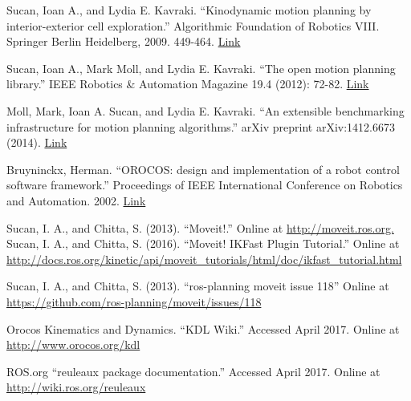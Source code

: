 \documentclass[12pt]{report}
\begin{document}
\begin{thebibliography}{99}
 Sucan, Ioan A., and Lydia E. Kavraki. ``Kinodynamic motion planning by interior-exterior cell exploration.'' Algorithmic Foundation of Robotics VIII. Springer Berlin Heidelberg, 2009. 449-464. \href{http://www.wafr.org/wafr2008/papers/wafr08-sucan.pdf}{Link}

 Sucan, Ioan A., Mark Moll, and Lydia E. Kavraki. ``The open motion planning library.'' IEEE Robotics \& Automation Magazine 19.4 (2012): 72-82. \href{http://ieeexplore.ieee.org/abstract/document/6377468/}{Link}

 Moll, Mark, Ioan A. Sucan, and Lydia E. Kavraki. ``An extensible benchmarking infrastructure for motion planning algorithms.'' arXiv preprint arXiv:1412.6673 (2014). \href{https://arxiv.org/pdf/1412.6673.pdf}{Link}

 Bruyninckx, Herman. ``OROCOS: design and implementation of a robot control software framework.'' Proceedings of IEEE International Conference on Robotics and Automation. 2002. \href{http://citeseerx.ist.psu.edu/viewdoc/download?doi=10.1.1.415.9503&rep=rep1&type=pdf}{Link}

 Sucan, I. A., and Chitta, S. (2013). ``Moveit!.'' Online at \url{http://moveit.ros.org.}
 Sucan, I. A., and Chitta, S. (2016). ``Moveit! IKFast Plugin Tutorial.'' Online at \url{http://docs.ros.org/kinetic/api/moveit_tutorials/html/doc/ikfast_tutorial.html}

 Sucan, I. A., and Chitta, S. (2013). ``ros-planning moveit issue 118'' Online at \url{https://github.com/ros-planning/moveit/issues/118}

 Orocos Kinematics and Dynamics. ``KDL Wiki.'' Accessed April 2017. Online at \url{http://www.orocos.org/kdl}

 ROS.org ``reuleaux package documentation.'' Accessed April 2017. Online at \url{http://wiki.ros.org/reuleaux}

\end{thebibliography}

% 
% 

%

%
\end{document}
